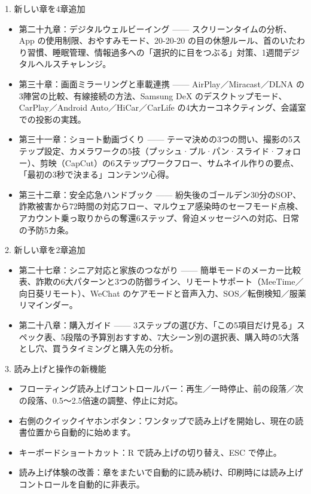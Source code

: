 
1. 新しい章を4章追加

\begin{itemize}
  \item 第二十九章：デジタルウェルビーイング —— スクリーンタイムの分析、App の使用制限、おやすみモード、20-20-20 の目の休憩ルール、首のいたわり習慣、睡眠管理、情報過多への「選択的に目をつぶる」対策、1週間デジタルヘルスチャレンジ。
  \item 第三十章：画面ミラーリングと車載連携 —— AirPlay／Miracast／DLNA の3陣営の比較、有線接続の方法、Samsung DeX のデスクトップモード、CarPlay／Android Auto／HiCar／CarLife の4大カーコネクティング、会議室での投影の実践。
  \item 第三十一章：ショート動画づくり —— テーマ決めの3つの問い、撮影の5ステップ設定、カメラワークの5技（プッシュ·プル·パン·スライド·フォロー）、剪映（CapCut）の6ステップワークフロー、サムネイル作りの要点、「最初の3秒で決まる」コンテンツ心得。
  \item 第三十二章：安全応急ハンドブック —— 紛失後のゴールデン30分のSOP、詐欺被害から72時間の対応フロー、マルウェア感染時のセーフモード点検、アカウント乗っ取りからの奪還6ステップ、脅迫メッセージへの対応、日常の予防5カ条。
\end{itemize}

2. 新しい章を2章追加

\begin{itemize}
  \item 第二十七章：シニア対応と家族のつながり —— 簡単モードのメーカー比較表、詐欺の6大パターンと3つの防御ライン、リモートサポート（MeeTime／向日葵リモート）、WeChat のケアモードと音声入力、SOS／転倒検知／服薬リマインダー。
  \item 第二十八章：購入ガイド —— 3ステップの選び方、「この5項目だけ見る」スペック表、5段階の予算別おすすめ、7大シーン別の選択表、購入時の5大落とし穴、買うタイミングと購入先の分析。
\end{itemize}

3. 読み上げと操作の新機能

\begin{itemize}
  \item フローティング読み上げコントロールバー：再生／一時停止、前の段落／次の段落、0.5〜2.5倍速の調整、停止に対応。
  \item 右側のクイックイヤホンボタン：ワンタップで読み上げを開始し、現在の読書位置から自動的に始めます。
  \item キーボードショートカット：R で読み上げの切り替え、ESC で停止。
  \item 読み上げ体験の改善：章をまたいで自動的に読み続け、印刷時には読み上げコントロールを自動的に非表示。
\end{itemize}

